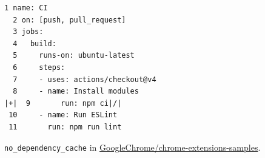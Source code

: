 \begin{figure}[htbp]
\centering
\begin{lstlisting}[style=ccscase]
  1 name: CI
  2 on: [push, pull_request]
  3 jobs:
  4   build:
  5     runs-on: ubuntu-latest
  6     steps:
  7     - uses: actions/checkout@v4
  8     - name: Install modules
|+|  9       run: npm ci|/|
 10     - name: Run ESLint
 11       run: npm run lint 
\end{lstlisting}
\caption{\texttt{no\_dependency\_cache} in \href{https://github.com/GoogleChrome/chrome-extensions-samples/blob/c4393862e164d74d1b6112ced19f2a2bbe26506c/.github/workflows/lint.yml}{GoogleChrome/chrome-extensions-samples}.}
\label{fig:ccs-dependency-code}
\end{figure}
